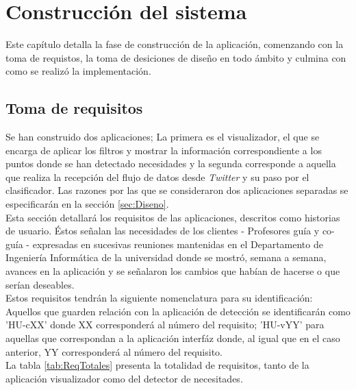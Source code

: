 \chapter{Construcción del sistema}
\label{cap:Construccion}

Este capítulo detalla la fase de construcción de la aplicación, comenzando con la toma de requistos, la toma de desiciones de diseño en todo ámbito y culmina con como se realizó la implementación.

\section{Toma de requisitos}
\label{sec:Requisitos}

Se han construido dos aplicaciones; La primera es el visualizador, el que se encarga de aplicar los filtros y mostrar la información correspondiente a los puntos donde se han detectado necesidades y la segunda corresponde a aquella que realiza la recepción del flujo de datos desde \textit{Twitter} y su paso por el clasificador. Las razones por las que se consideraron dos aplicaciones separadas se especificarán en la sección \ref{sec:Diseno}.\\

Esta sección detallará los requisitos de las aplicaciones, descritos como historias de usuario. Éstos señalan las necesidades de los clientes - Profesores guía y co-guía - expresadas en sucesivas reuniones mantenidas en el Departamento de Ingeniería Informática de la universidad donde se mostró, semana a semana, avances en la aplicación y se señalaron los cambios que habían de hacerse o que serían deseables.\\

Estos requisitos tendrán la siguiente nomenclatura para su identificación: Aquellos que guarden relación con la aplicación de detección se identificarán como 'HU-cXX' donde XX corresponderá al número del requisito; 'HU-vYY' para aquellas que correspondan a la aplicación interfáz donde, al igual que en el caso anterior, YY corresponderá al número del requisito.\\

La tabla \ref{tab:ReqTotales} presenta la totalidad de requisitos, tanto de la aplicación visualizador como del detector de necesitades.\\

